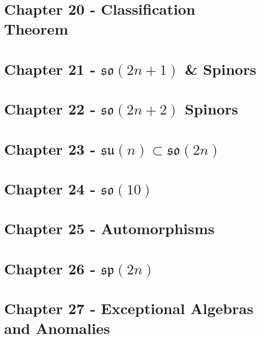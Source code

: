 \documentclass[a4paper,11pt]{article}
\begin{document}
\section{Chapter 20 - Classification Theorem}\label{Sec:20}


\section{Chapter 21 - $\mathfrak{so}(2n+1)$ \& Spinors}\label{Sec:21}


\section{Chapter 22 - $\mathfrak{so}(2n+2)$ Spinors}\label{Sec:22}


\section{Chapter 23 - $\mathfrak{su}(n)\subset\mathfrak{so}(2n)$}\label{Sec:23}


\section{Chapter 24 - $\mathfrak{so}(10)$}\label{Sec:24}


\section{Chapter 25 - Automorphisms}\label{Sec:25}


\section{Chapter 26 - $\mathfrak{sp}(2n)$}\label{Sec:26}


\section{Chapter 27 - Exceptional Algebras and Anomalies}\label{Sec:27}







\end{document}
